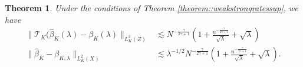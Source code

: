 \documentclass[11pt]{article}
\theoremstyle{plain}
\newtheorem{theorem}{Theorem}
\theoremstyle{definition}
\theoremstyle{remark}
\theoremstyle{definition}
\begin{document}
 

 
 
 


\begin{theorem}
\label{cor::estimationerrorsup}
Under the conditions of Theorem \ref{theorem::weakstrongratessup}, we have
\begin{align*}
\|\mathcal{T}_{K}(\widehat{\beta}_K(\lambda)-\beta_{K}(\lambda)\|_{L^2_K(Z)}& \lesssim N^{-\frac{\gamma}{2\gamma+1}} \left( 1 + \frac{n^{-\frac{\gamma}{2\gamma+1}}}{\sqrt{\lambda}}  + \sqrt{\lambda} \right)\\
\|\widehat{\beta}_K-\beta_{K,\lambda}\|_{L^2_K(X)} &\lesssim  \lambda^{-1/2} N^{-\frac{\gamma}{2\gamma+1}} \left( 1 + \frac{n^{-\frac{\gamma}{2\gamma+1}}}{\sqrt{\lambda}}  + \sqrt{\lambda} \right).
\end{align*} 
\end{theorem}
 
 
 
\end{document}
